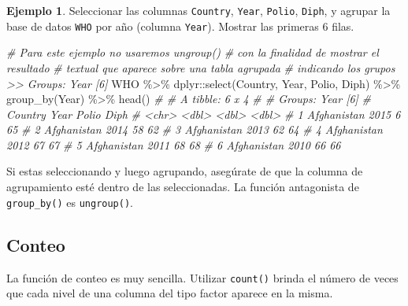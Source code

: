\documentclass[
]{article}
\newenvironment{Shaded}{\begin{snugshade}}{\end{snugshade}}
\newcommand{\CommentTok}[1]{\textcolor[rgb]{0.56,0.35,0.01}{\textit{#1}}}
\newcommand{\FunctionTok}[1]{\textcolor[rgb]{0.00,0.00,0.00}{#1}}
\newcommand{\NormalTok}[1]{#1}
\newcommand{\SpecialCharTok}[1]{\textcolor[rgb]{0.00,0.00,0.00}{#1}}
\theoremstyle{definition}
\theoremstyle{definition}
\newtheorem{example}{Ejemplo}[section]
\theoremstyle{definition}
\theoremstyle{definition}
\theoremstyle{remark}
\begin{document}
\begin{example}

Seleccionar las columnas \texttt{Country}, \texttt{Year}, \texttt{Polio}, \texttt{Diph}, y agrupar la base de datos \texttt{WHO} por año (columna \texttt{Year}). Mostrar las primeras 6 filas.

\begin{Shaded}
\begin{Highlighting}[]
\CommentTok{\# Para este ejemplo no usaremos ungroup()}
\CommentTok{\# con la finalidad de mostrar el resultado}
\CommentTok{\# textual que aparece sobre una tabla agrupada}
\CommentTok{\# indicando los grupos \textgreater{}\textgreater{} Groups:   Year [6]}
\NormalTok{WHO }\SpecialCharTok{\%\textgreater{}\%} 
\NormalTok{  dplyr}\SpecialCharTok{::}\FunctionTok{select}\NormalTok{(Country, Year, Polio, Diph) }\SpecialCharTok{\%\textgreater{}\%}
  \FunctionTok{group\_by}\NormalTok{(Year) }\SpecialCharTok{\%\textgreater{}\%} 
  \FunctionTok{head}\NormalTok{()}
\CommentTok{\# \# A tibble: 6 x 4}
\CommentTok{\# \# Groups:   Year [6]}
\CommentTok{\#   Country      Year Polio  Diph}
\CommentTok{\#   \textless{}chr\textgreater{}       \textless{}dbl\textgreater{} \textless{}dbl\textgreater{} \textless{}dbl\textgreater{}}
\CommentTok{\# 1 Afghanistan  2015     6    65}
\CommentTok{\# 2 Afghanistan  2014    58    62}
\CommentTok{\# 3 Afghanistan  2013    62    64}
\CommentTok{\# 4 Afghanistan  2012    67    67}
\CommentTok{\# 5 Afghanistan  2011    68    68}
\CommentTok{\# 6 Afghanistan  2010    66    66}
\end{Highlighting}
\end{Shaded}

\end{example}

\begin{rmdnote}
Si estas seleccionando y luego agrupando, asegúrate de que la columna de agrupamiento esté dentro de las seleccionadas. La función antagonista de \texttt{group\_by()} es \texttt{ungroup()}.
\end{rmdnote}

\hypertarget{conteo}{%
\subsection{Conteo}\label{conteo}}

La función de conteo es muy sencilla. Utilizar \texttt{count()} brinda el número de veces que cada nivel de una columna del tipo factor aparece en la misma.
\end{document}
